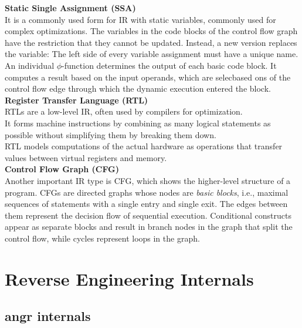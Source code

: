 \documentclass[seminar]{plai}
\begin{document}
\noindent\textbf{Static Single Assignment (SSA)}\\
It is a commonly used form for IR with static variables, commonly used for complex optimizations. The variables in the code blocks of the control flow graph have the restriction that they cannot be updated. Instead, a new version replaces the variable\cite{introduction-to-compilers-and-language-design}: The left side of every variable assignment must have a unique name. An individual $\phi$-function determines the output of each basic code block. It computes a result based on the input operands, which are selecbased ons of the control flow edge through which the dynamic execution entered the block.\cite{interpreting-programs-in-SSA-form}\\


\noindent\textbf{Register Transfer Language (RTL)}\\
RTLs are a low-level IR, often used by compilers for optimization.\\
It forms machine instructions by combining as many logical statements as possible without simplifying them by breaking them down.\\
RTL models computations of the actual hardware as operations that transfer values between virtual registers and memory.
\cite{The-RTL-System-A-Framework-for-Code-Optimization}\\

\noindent\textbf{Control Flow Graph (CFG)}\\
Another important IR type is CFG, which shows the higher-level structure of a program. CFGs are directed graphs whose nodes are \textit{basic blocks}, i.e., maximal sequences of statements with a single entry and single exit.
The edges between them represent the decision flow of sequential execution. Conditional constructs appear as separate blocks and result in branch nodes in the graph that split the control flow, while cycles represent loops in the graph.
\cite{introduction-to-compilers-and-language-design}

\section{Reverse Engineering Internals}
\label{sec:reverse-engineering-internals}

\subsection{angr internals}
\label{sec:angr-internals}
\end{document}
